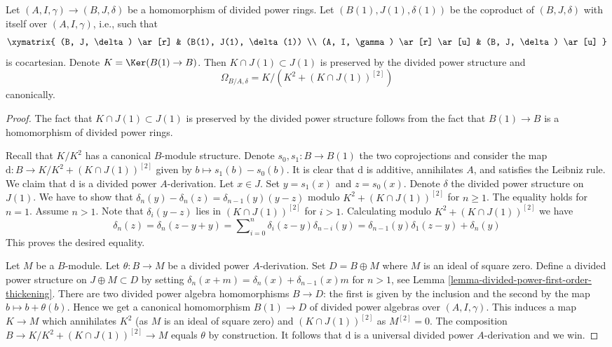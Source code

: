 \begin{lemma}
\label{lemma-diagonal-and-differentials}
Let $(A, I, \gamma) \to (B, J, \delta)$ be a homomorphism
of divided power rings. Let $(B(1), J(1), \delta(1))$ be the coproduct
of $(B, J, \delta)$ with itself over $(A, I, \gamma)$, i.e.,
such that
$$
\xymatrix{
(B, J, \delta) \ar[r] & (B(1), J(1), \delta(1)) \\
(A, I, \gamma) \ar[r] \ar[u] & (B, J, \delta) \ar[u]
}
$$
is cocartesian. Denote $K = \Ker(B(1) \to B)$.
Then $K \cap J(1) \subset J(1)$ is preserved by the divided power
structure and
$$
\Omega_{B/A, \delta} = K/ \left(K^2 + (K \cap J(1))^{[2]}\right)
$$
canonically.
\end{lemma}

\begin{proof}
The fact that $K \cap J(1) \subset J(1)$ is preserved by the divided power
structure follows from the fact that $B(1) \to B$ is a homomorphism of
divided power rings.

\medskip\noindent
Recall that $K/K^2$ has a canonical $B$-module structure.
Denote $s_0, s_1 : B \to B(1)$ the two coprojections and consider
the map $\text{d} : B \to K/K^2 +(K \cap J(1))^{[2]}$ given by
$b \mapsto s_1(b) - s_0(b)$. It is clear that $\text{d}$ is additive,
annihilates $A$, and satisfies the Leibniz rule.
We claim that $\text{d}$ is a divided power $A$-derivation.
Let $x \in J$. Set $y = s_1(x)$ and $z = s_0(x)$.
Denote $\delta$ the divided power structure on $J(1)$.
We have to show that $\delta_n(y) - \delta_n(z) = \delta_{n - 1}(y)(y - z)$
modulo $K^2 +(K \cap J(1))^{[2]}$ for $n \geq 1$.
The equality holds for $n = 1$. Assume $n > 1$.
Note that $\delta_i(y - z)$ lies in $(K \cap J(1))^{[2]}$ for $i > 1$.
Calculating modulo $K^2 + (K \cap J(1))^{[2]}$ we have
$$
\delta_n(z) = \delta_n(z - y + y) =
\sum\nolimits_{i = 0}^n \delta_i(z - y)\delta_{n - i}(y) =
\delta_{n - 1}(y) \delta_1(z - y) + \delta_n(y)
$$
This proves the desired equality.

\medskip\noindent
Let $M$ be a $B$-module. Let $\theta : B \to M$ be a divided power
$A$-derivation.
Set $D = B \oplus M$ where $M$ is an ideal of square zero. Define a
divided power structure on $J \oplus M \subset D$ by setting
$\delta_n(x + m) = \delta_n(x) + \delta_{n - 1}(x)m$ for $n > 1$, see
Lemma \ref{lemma-divided-power-first-order-thickening}.
There are two divided power algebra homomorphisms $B \to D$: the first
is given by the inclusion and the second by the map $b \mapsto b + \theta(b)$.
Hence we get a canonical homomorphism $B(1) \to D$ of divided power
algebras over $(A, I, \gamma)$. This induces a map $K \to M$
which annihilates $K^2$ (as $M$ is an ideal of square zero) and
$(K \cap J(1))^{[2]}$ as $M^{[2]} = 0$. The composition
$B \to K/K^2 + (K \cap J(1))^{[2]} \to M$ equals $\theta$ by construction.
It follows that $\text{d}$
is a universal divided power $A$-derivation and we win.
\end{proof}

